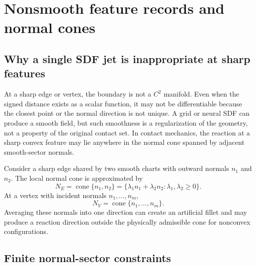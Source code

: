 \documentclass[preprint,12pt,sort&compress]{elsarticle}
\newcommand{\cone}{\operatorname{cone}}
\begin{document}
\section{Nonsmooth feature records and normal cones}
\label{sec:nonsmooth}

\subsection{Why a single SDF jet is inappropriate at sharp features}

At a sharp edge or vertex, the boundary is not a $C^2$ manifold. Even when the signed distance exists as a scalar function, it may not be differentiable because the closest point or the normal direction is not unique. A grid or neural SDF can produce a smooth field, but such smoothness is a regularization of the geometry, not a property of the original contact set. In contact mechanics, the reaction at a sharp convex feature may lie anywhere in the normal cone spanned by adjacent smooth-sector normals.

Consider a sharp edge shared by two smooth charts with outward normals $n_1$ and $n_2$. The local normal cone is approximated by
\begin{equation}
 N_E = \cone\{n_1,n_2\}=\{\lambda_1 n_1+\lambda_2 n_2:\lambda_1,\lambda_2\geq0\}.
\label{eq:edge_cone}
\end{equation}
At a vertex with incident normals $n_1,\ldots,n_m$,
\begin{equation}
 N_V = \cone\{n_1,\ldots,n_m\}.
\label{eq:vertex_cone}
\end{equation}
Averaging these normals into one direction can create an artificial fillet and may produce a reaction direction outside the physically admissible cone for nonconvex configurations.

\subsection{Finite normal-sector constraints}
\end{document}
